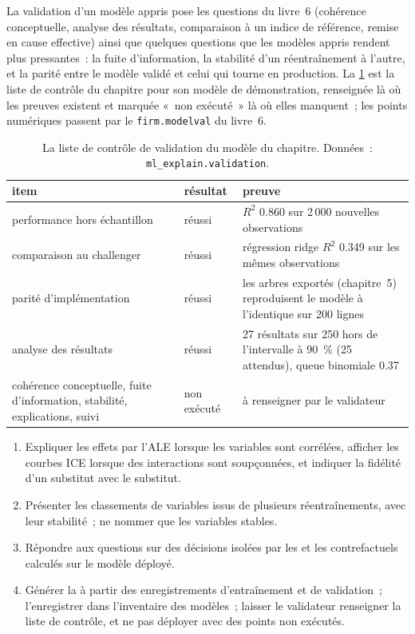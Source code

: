 La validation d'un modèle appris pose les questions du livre~6 (cohérence conceptuelle, analyse des résultats, comparaison à un indice de référence,
remise en cause effective) ainsi que quelques questions que les modèles appris rendent plus pressantes~: la fuite d'information, la stabilité d'un réentraînement à l'autre, et la
parité entre le modèle validé et celui qui tourne en production. La \cref{tab:ml:gov:checklist} est la liste de contrôle du chapitre pour son modèle de démonstration, renseignée là où les preuves existent et marquée
«~non exécuté~» là où elles manquent~; les points numériques passent par le
\texttt{firm.modelval} du livre~6.

\begin{table}[htbp]
\centering\small
\begin{tabular}{@{}p{4.3cm}lp{7.0cm}@{}}
\toprule
item & résultat & preuve\\
\midrule
performance hors échantillon & réussi & $R^2$ 0.860 sur 2\,000 nouvelles observations\\
comparaison au challenger & réussi & régression ridge $R^2$ 0.349 sur les mêmes observations\\
parité d'implémentation & réussi & les arbres exportés (chapitre~5) reproduisent le modèle à l'identique sur 200 lignes\\
analyse des résultats & réussi & 27 résultats sur 250 hors de l'intervalle à 90~\% (25 attendus), queue binomiale 0.37\\
cohérence conceptuelle, fuite d'information, stabilité, explications, suivi & non exécuté & à renseigner par le validateur\\
\bottomrule
\end{tabular}
\caption{La liste de contrôle de validation du modèle du chapitre. Données~: \texttt{ml\_explain.validation}.}\label{tab:ml:gov:checklist}
\end{table}

\begin{method}\label{met:ml:gov:method}
\begin{enumerate}
\item Expliquer les effets par l'ALE lorsque les variables sont corrélées, afficher les courbes ICE lorsque des interactions sont soupçonnées, et indiquer la
fidélité d'un substitut avec le substitut.
\item Présenter les classements de variables issus de plusieurs réentraînements, avec leur stabilité~; ne nommer que les variables stables.
\item Répondre aux questions sur des décisions isolées par les  et les contrefactuels calculés sur le modèle déployé.
\item Générer la  à partir des enregistrements d'entraînement et de validation~; l'enregistrer dans l'inventaire des modèles~; laisser le validateur
renseigner la liste de contrôle, et ne pas déployer avec des points non exécutés.
\end{enumerate}
\end{method}

